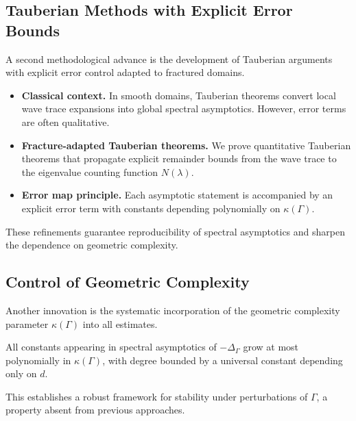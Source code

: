 \subsection{Tauberian Methods with Explicit Error Bounds}

A second methodological advance is the development of Tauberian arguments with
explicit error control adapted to fractured domains.

\begin{itemize}
  \item \textbf{Classical context.} In smooth domains, Tauberian theorems
  convert local wave trace expansions into global spectral asymptotics.
  However, error terms are often qualitative.
  \item \textbf{Fracture-adapted Tauberian theorems.} We prove quantitative
  Tauberian theorems that propagate explicit remainder bounds from the wave
  trace to the eigenvalue counting function $N(\lambda)$.
  \item \textbf{Error map principle.} Each asymptotic statement is accompanied
  by an explicit error term with constants depending polynomially on
  $\kappa(\Gamma)$.
\end{itemize}

These refinements guarantee reproducibility of spectral asymptotics and sharpen
the dependence on geometric complexity.

\subsection{Control of Geometric Complexity}

Another innovation is the systematic incorporation of the geometric complexity
parameter $\kappa(\Gamma)$ into all estimates.

\begin{proposition}
All constants appearing in spectral asymptotics of $-\Delta_\Gamma$ grow at
most polynomially in $\kappa(\Gamma)$, with degree bounded by a universal
constant depending only on $d$.
\end{proposition}

This establishes a robust framework for stability under perturbations of
$\Gamma$, a property absent from previous approaches.

